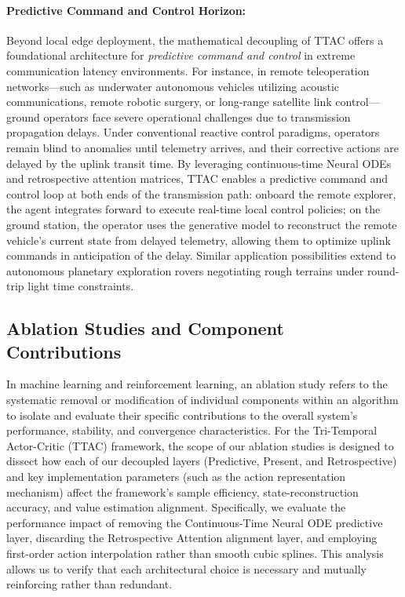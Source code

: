 \documentclass[manuscript, screen, review]{jair}
\begin{document}
\paragraph{Predictive Command and Control Horizon:} Beyond local edge deployment, the mathematical decoupling of TTAC offers a foundational architecture for \textit{predictive command and control} in extreme communication latency environments. For instance, in remote teleoperation networks---such as underwater autonomous vehicles utilizing acoustic communications, remote robotic surgery, or long-range satellite link control---ground operators face severe operational challenges due to transmission propagation delays. Under conventional reactive control paradigms, operators remain blind to anomalies until telemetry arrives, and their corrective actions are delayed by the uplink transit time. By leveraging continuous-time Neural ODEs and retrospective attention matrices, TTAC enables a predictive command and control loop at both ends of the transmission path: onboard the remote explorer, the agent integrates forward to execute real-time local control policies; on the ground station, the operator uses the generative model to reconstruct the remote vehicle's current state from delayed telemetry, allowing them to optimize uplink commands in anticipation of the delay. Similar application possibilities extend to autonomous planetary exploration rovers negotiating rough terrains under round-trip light time constraints.

\subsection{Ablation Studies and Component Contributions}
In machine learning and reinforcement learning, an ablation study refers to the systematic removal or modification of individual components within an algorithm to isolate and evaluate their specific contributions to the overall system's performance, stability, and convergence characteristics. For the Tri-Temporal Actor-Critic (TTAC) framework, the scope of our ablation studies is designed to dissect how each of our decoupled layers (Predictive, Present, and Retrospective) and key implementation parameters (such as the action representation mechanism) affect the framework's sample efficiency, state-reconstruction accuracy, and value estimation alignment. Specifically, we evaluate the performance impact of removing the Continuous-Time Neural ODE predictive layer, discarding the Retrospective Attention alignment layer, and employing first-order action interpolation rather than smooth cubic splines. This analysis allows us to verify that each architectural choice is necessary and mutually reinforcing rather than redundant.
\end{document}
